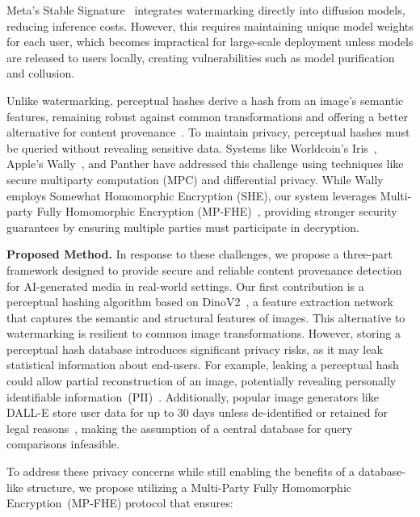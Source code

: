 \documentclass[11pt]{article}
\begin{document}
Meta's Stable Signature~\cite{meta2023stablesig} integrates watermarking directly into diffusion models, reducing inference costs. However, this requires maintaining unique model weights for each user, which becomes impractical for large-scale deployment unless models are released to users locally, creating vulnerabilities such as model purification and collusion.

Unlike watermarking, perceptual hashes derive a hash from an image’s semantic features, remaining robust against common transformations and offering a better alternative for content provenance~\cite{phash2020}. To maintain privacy, perceptual hashes must be queried without revealing sensitive data. Systems like Worldcoin’s Iris~\cite{iris-search}, Apple's Wally~\cite{wally-search}, and Panther have addressed this challenge using techniques like secure multiparty computation (MPC) and differential privacy. While Wally employs Somewhat Homomorphic Encryption (SHE), our system leverages Multi-party Fully Homomorphic Encryption (MP-FHE)~\cite{mouchet2021multiparty, lee2023efficient}, providing stronger security guarantees by ensuring multiple parties must participate in decryption.\\

\par\noindent\textbf{Proposed Method.} In response to these challenges, we propose a three-part framework designed to provide secure and reliable content provenance detection for AI-generated media in real-world settings.
Our first contribution is a perceptual hashing algorithm based on DinoV2~\cite{oquab2023dinov2}, a feature extraction network that captures the semantic and structural features of images. This alternative to watermarking is resilient to common image transformations. However, storing a perceptual hash database introduces significant privacy risks, as it may leak statistical information about end-users. For example, leaking a perceptual hash could allow partial reconstruction of an image, potentially revealing personally identifiable information~(PII)~\cite{perceptual_hash_security_2024}. Additionally, popular image generators like DALL-E store user data for up to 30 days unless de-identified or retained for legal reasons~\cite{OpenAIHelp}, making the assumption of a central database for query comparisons infeasible.

To address these privacy concerns while still enabling the benefits of a database-like structure, we propose utilizing a Multi-Party Fully Homomorphic Encryption~(MP-FHE) protocol that ensures:
\end{document}

